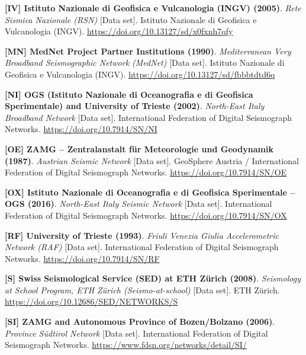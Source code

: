 \begin{enumerate}[label={[\textbf{\arabic*}]},leftmargin=*]
  \item \textbf{[IV] Istituto Nazionale di Geofisica e Vulcanologia (INGV) (2005)}. 
  \textit{Rete Sismica Nazionale (RSN)} [Data set]. 
  Istituto Nazionale di Geofisica e Vulcanologia (INGV). 
  \url{https://doi.org/10.13127/sd/x0fxnh7qfy}

  \item \textbf{[MN] MedNet Project Partner Institutions (1990)}. 
  \textit{Mediterranean Very Broadband Seismographic Network (MedNet)} [Data set]. 
  Istituto Nazionale di Geofisica e Vulcanologia (INGV). 
  \url{https://doi.org/10.13127/sd/fbbbtdtd6q}

  \item \textbf{[NI] OGS (Istituto Nazionale di Oceanografia e di Geofisica Sperimentale) and University of Trieste (2002)}. 
  \textit{North-East Italy Broadband Network} [Data set]. 
  International Federation of Digital Seismograph Networks. 
  \url{https://doi.org/10.7914/SN/NI}

  \item \textbf{[OE] ZAMG -- Zentralanstalt f\"ur Meteorologie und Geodynamik (1987)}. 
  \textit{Austrian Seismic Network} [Data set]. 
  GeoSphere Austria / International Federation of Digital Seismograph Networks. 
  \url{https://doi.org/10.7914/SN/OE}

  \item \textbf{[OX] Istituto Nazionale di Oceanografia e di Geofisica Sperimentale -- OGS (2016)}. 
  \textit{North-East Italy Seismic Network} [Data set]. 
  International Federation of Digital Seismograph Networks. 
  \url{https://doi.org/10.7914/SN/OX}

  \item \textbf{[RF] University of Trieste (1993)}. 
  \textit{Friuli Venezia Giulia Accelerometric Network (RAF)} [Data set]. 
  International Federation of Digital Seismograph Networks. 
  \url{https://doi.org/10.7914/SN/RF}

  \item \textbf{[S] Swiss Seismological Service (SED) at ETH Z\"urich (2008)}. 
  \textit{Seismology at School Program, ETH Z\"urich (Seismo-at-school)} [Data set]. 
  ETH Z\"urich. 
  \url{https://doi.org/10.12686/SED/NETWORKS/S}

  \item \textbf{[SI] ZAMG and Autonomous Province of Bozen/Bolzano (2006)}. 
  \textit{Province S\"udtirol Network} [Data set]. 
  International Federation of Digital Seismograph Networks. 
  \url{https://www.fdsn.org/networks/detail/SI/}


\end{enumerate}
